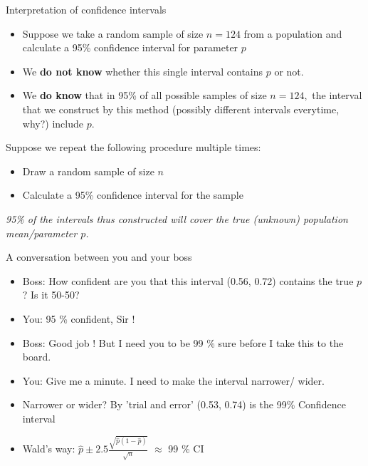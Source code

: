 \documentclass{beamer}\usepackage[]{graphicx}\usepackage[]{color}
\begin{document}
\begin{frame}{Interpretation of confidence intervals}

\begin{itemize}  
\item  Suppose we take a random sample of size $n=124$ from a population and
calculate a 95\% confidence interval for parameter $p$\\

\item We {\bf do not know} whether this single interval contains $p$ or not.\\ \pause

\item We {\bf do know} that in 95\% of all possible samples of size $n=124,$ the
interval that we construct by this method (possibly different intervals everytime, why?)  include $p.$ \pause
\end{itemize}
\vskip0.2cm

  Suppose we repeat the following procedure multiple times:
  \begin{itemize}
  \item Draw a random sample of size $n$ 
  \item Calculate a 95\% confidence interval for the sample
  \end{itemize}
  \pause
  \textit{95\% of the intervals thus constructed will cover the true
    (unknown) population mean/parameter $p$.}\vspace{1pt}

\end{frame}



\begin{frame}{A conversation between you and your boss}

\begin{itemize}
\item Boss: How confident are you that this interval (0.56, 0.72) contains the true $p$? \pause Is it 50-50?  \pause
\item You: 95 \% confident, Sir !  \pause
\item Boss: Good job ! But I need you to be 99 \% sure before I take this to the board. \pause
\item You: Give me a minute. \pause I need to make the interval narrower/ wider. \pause

\item Narrower or wider? \pause By 'trial and error' (0.53, 0.74) is the 99\% Confidence interval   \\ \pause

\item Wald's way: $\hat{p} \pm 2.5 \frac{\sqrt{\hat{p}(1-\hat{p})}}{\sqrt{n}}$  $ \approx$ 99 \% CI \pause
\end{itemize}

\end{frame}
\end{document}
